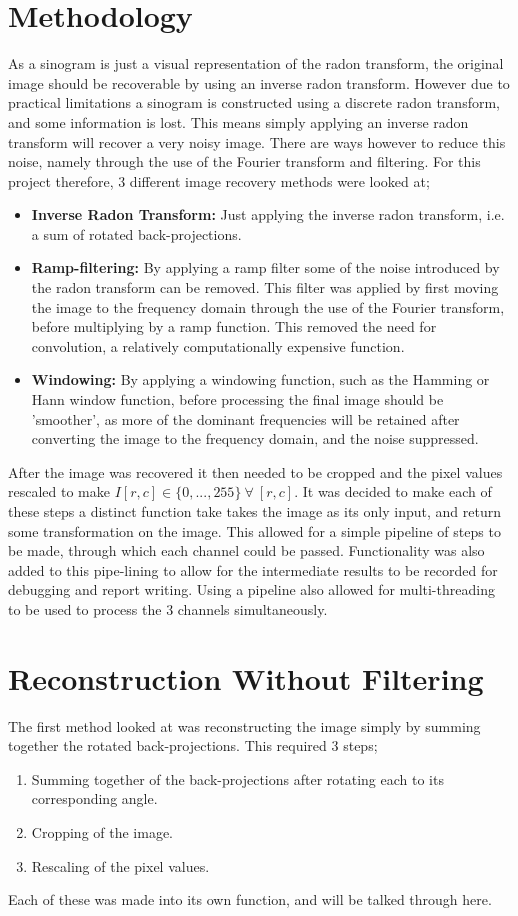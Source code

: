 \documentclass[12pt, a4paper]{article}
\begin{document}
\section*{Methodology}
	As a sinogram is just a visual representation of the radon transform, the original image should be recoverable by using an inverse radon transform. However due to practical limitations a sinogram is constructed using a discrete radon transform, and some information is lost. This means simply applying an inverse radon transform will recover a very noisy image. There are ways however to reduce this noise, namely through the use of the Fourier transform and filtering. For this project therefore, 3 different image recovery methods were looked at;
	\begin{itemize}
		\item \textbf{Inverse Radon Transform:} Just applying the inverse radon transform, i.e. a sum of rotated back-projections.
		\item \textbf{Ramp-filtering:} By applying a ramp filter some of the noise introduced by the radon transform can be removed. This filter was applied by first moving the image to the frequency domain through the use of the Fourier transform, before multiplying by a ramp function. This removed the need for convolution, a relatively computationally expensive function.
		\item \textbf{Windowing:} By applying a windowing function, such as the Hamming or Hann window function, before processing the final image should be 'smoother', as more of the dominant frequencies will be retained after converting the image to the frequency domain, and the noise suppressed.
	\end{itemize}
	After the image was recovered it then needed to be cropped and the pixel values rescaled to make $I[r, c] \in \{0,...,255\}\ \forall\ [r, c]$. It was decided to make each of these steps a distinct function take takes the image as its only input, and return some transformation on the image. This allowed for a simple pipeline of steps to be made, through which each channel could be passed. Functionality was also added to this pipe-lining to allow for the intermediate results to be recorded for debugging and report writing. Using a pipeline also allowed for multi-threading to be used to process the 3 channels simultaneously.
	
\section*{Reconstruction Without Filtering}
	The first method looked at was reconstructing the image simply by summing together the rotated back-projections. This required 3 steps;
	\begin{enumerate}
		\item Summing together of the back-projections after rotating each to its corresponding angle.
		\item Cropping of the image.
		\item Rescaling of the pixel values.
	\end{enumerate}
	Each of these was made into its own function, and will be talked through here.
\end{document}
